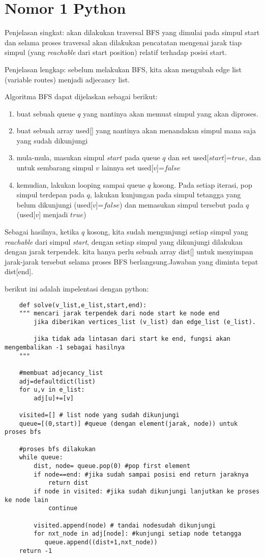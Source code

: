 \documentclass[12pt,letterpaper]{article}
\begin{document}
\section{Nomor 1 Python}
Penjelasan singkat: akan dilakukan traversal BFS yang dimulai pada simpul start dan selama proses traversal
akan dilakukan pencatatan mengenai jarak tiap simpul (yang \textit{reachable} dari start position) relatif terhadap posisi start.
\vline

 Penjelasan lengkap: sebelum melakukan BFS, kita akan mengubah edge list (variable routes) menjadi adjecancy list. 

Algoritma BFS dapat dijelaskan sebagai berikut:
\begin{enumerate}
    \item buat sebuah queue $q$ yang nantinya akan memuat simpul yang akan diproses.
    \item buat sebuah array used[] yang nantinya akan menandakan simpul mana saja yang sudah dikunjungi
    \item  mula-mula, masukan simpul $start$ pada queue $q$ dan set used[$start$]=$true$, dan untuk sembarang simpul $v$ lainnya set used[$v$]=$false$
    \item kemudian, lakukan looping sampai queue $q$ kosong. Pada setiap iterasi, pop simpul terdepan pada $q$, lakukan kunjungan pada simpul tetangga yang belum dikunjungi (used[$v$]=$false$) dan memasukan simpul tersebut pada $q$ (used[$v$] menjadi $true$)
\end{enumerate}
Sebagai hasilnya, ketika $q$ kosong, kita sudah mengunjungi setiap simpul yang \textit{reachable} dari simpul \textit{start}, dengan setiap simpul yang dikunjungi dilakukan dengan jarak terpendek.
kita hanya perlu sebuah array dist[] untuk menyimpan jarak-jarak tersebut selama proses BFS berlangsung.Jawaban yang diminta tepat dist[end].

berikut ini adalah impelentasi dengan python:

\break 
\begin{lstlisting}
    def solve(v_list,e_list,start,end):
    """ mencari jarak terpendek dari node start ke node end
        jika diberikan vertices_list (v_list) dan edge_list (e_list).

        jika tidak ada lintasan dari start ke end, fungsi akan mengembalikan -1 sebagai hasilnya
    """

    #membuat adjecancy_list
    adj=defaultdict(list)
    for u,v in e_list:
        adj[u]+=[v]

    visited=[] # list node yang sudah dikunjungi
    queue=[(0,start)] #queue (dengan element(jarak, node)) untuk proses bfs

    #proses bfs dilakukan
    while queue:
        dist, node= queue.pop(0) #pop first element
        if node==end: #jika sudah sampai posisi end return jaraknya
            return dist
        if node in visited: #jika sudah dikunjungi lanjutkan ke proses ke node lain
            continue

        visited.append(node) # tandai nodesudah dikunjungi
        for nxt_node in adj[node]: #kunjungi setiap node tetangga
           queue.append((dist+1,nxt_node))
    return -1

\end{lstlisting}
\end{document}
